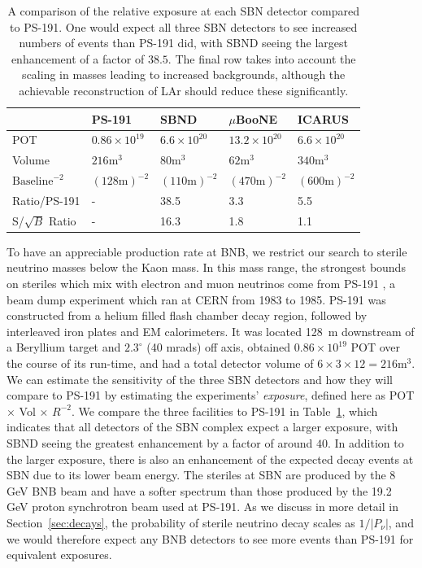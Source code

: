 \documentclass[11pt, a4paper]{article}
\newcommand{\refsec}[1]{Section~\ref{#1}}
\newcommand{\reftab}[1]{Table~\ref{#1}}
\begin{document}
\begin{table}[t!]
\centering
\begin{tabular}{| l || l | l | l | l |}
	\hline
	& PS-191 & SBND & $\mu$BooNE & ICARUS \\ \hline \hline
	POT	& $0.86 \times 10^{19}$	& $6.6 \times 10^{20}$	&	$13.2 \times 10^{20}$     &  $6.6 \times 10^{20}$ \\ \hline
	Volume	& $216\text{m}^3$	&	$80\text{m}^3$	&	$62\text{m}^3$	     &   $340\text{m}^3$	\\ \hline
	$\text{Baseline}^{-2}$	& $(128 	\text{m} )^{-2}$	&$(110 \text{m} )^{-2}$	&	$(470 \text{m} )^{-2}$			     & $(600 \text{m} )^{-2}$	  \\ \hline
Ratio/PS-191 & - 	& 38.5 	& 3.3	& 5.5\\ \hline
	S/$\sqrt{B}$ Ratio & - 	& 16.3 	& 1.8	& 1.1\\ \hline
\end{tabular}

\caption{\label{tab:exposure} A comparison of the relative exposure at each SBN detector
compared to PS-191. One would expect all  three SBN detectors to see increased
numbers of events than PS-191 did, with SBND seeing the largest enhancement of a
factor of $38.5$. The final row takes into account the scaling in masses
leading to increased backgrounds, although the achievable reconstruction of LAr
should reduce these significantly.}

\end{table}

To have an appreciable production rate at BNB, we restrict our search to
sterile neutrino masses below the Kaon mass. In this mass range, the strongest
bounds on steriles which mix with electron and muon neutrinos come from PS-191
\cite{Bernardi:1985ny,Bernardi:1987ek}, a beam dump experiment which ran at
CERN from 1983 to 1985. 
%
PS-191 was constructed from a helium filled flash chamber decay region,
followed by interleaved iron plates and EM calorimeters. It was located 128~m
downstream of a Beryllium target and $2.3^\circ$ (40 mrads) off axis, obtained
$0.86 \times 10^{19}$ POT over the course of its run-time, and had a total
detector volume of $6\times3\times12 = 216 \text{m}^3$. We can estimate the
sensitivity of the three SBN detectors and how they will compare to PS-191 by
estimating the experiments' \emph{exposure}, defined here as POT $\times$ Vol
$\times$ $R^{-2}$. We compare the three facilities to PS-191 in
\reftab{tab:exposure}, which indicates that all detectors of the SBN complex expect
a larger exposure, with SBND seeing the greatest enhancement by a factor of
around $40$. 
%
In addition to the larger exposure, there is also an enhancement of the
expected decay events at SBN due to its lower beam energy. The steriles at SBN
are produced by the 8 GeV BNB beam and have a softer spectrum than those
produced by the 19.2 GeV proton synchrotron beam used at PS-191. As we discuss
in more detail in \refsec{sec:decays}, the probability of sterile neutrino
decay scales as $1/|P_\nu|$, and we would therefore expect any BNB detectors to
see more events than PS-191 for equivalent exposures.
\end{document}
